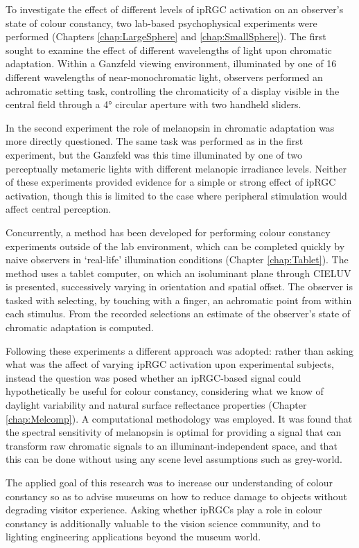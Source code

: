 To investigate the effect of different levels of \gls{ipRGC} activation on an observer's state of colour constancy,	two lab-based psychophysical experiments were performed (Chapters \ref{chap:LargeSphere} and \ref{chap:SmallSphere}). The first sought to examine the effect of different wavelengths of light upon chromatic adaptation. Within a Ganzfeld viewing environment, illuminated by one of 16 different wavelengths of near-monochromatic light, observers performed an achromatic setting task, controlling the chromaticity of a display visible in the central field through a 4° circular aperture with two handheld sliders.

In the second experiment the role of melanopsin in chromatic adaptation was more directly questioned. The same task was performed as in the first experiment, but the Ganzfeld was this time illuminated by one of two perceptually metameric lights with different melanopic irradiance levels. Neither of these experiments provided evidence for a simple or strong effect of ipRGC activation, though this is limited to the case where peripheral stimulation would affect central perception.

Concurrently, a method has been developed for performing colour constancy experiments outside of the lab environment, which can be completed quickly by naive observers in `real-life' illumination conditions (Chapter \ref{chap:Tablet}). The method uses a tablet computer, on which an isoluminant plane through CIELUV is presented, successively varying in orientation and spatial offset. The observer is tasked with selecting, by touching with a finger, an achromatic point from within each stimulus. From the recorded selections an estimate of the observer's state of chromatic adaptation is computed.

Following these experiments a different approach was adopted: rather than asking what was the affect of varying \gls{ipRGC} activation upon experimental subjects, instead the question was posed whether an \gls{ipRGC}-based signal could hypothetically be useful for colour constancy, considering what we know of daylight variability and natural surface reflectance properties (Chapter \ref{chap:Melcomp}). A computational methodology was employed. It was found that the spectral sensitivity of melanopsin is optimal for providing a signal that can transform raw chromatic signals to an illuminant-independent space, and that this can be done without using any scene level assumptions such as grey-world.

The applied goal of this research was to increase our understanding of colour constancy so as to advise museums on how to reduce damage to objects without degrading visitor experience. Asking whether \glspl{ipRGC} play a role in colour constancy is additionally valuable to the vision science community, and to lighting engineering applications beyond the museum world.


